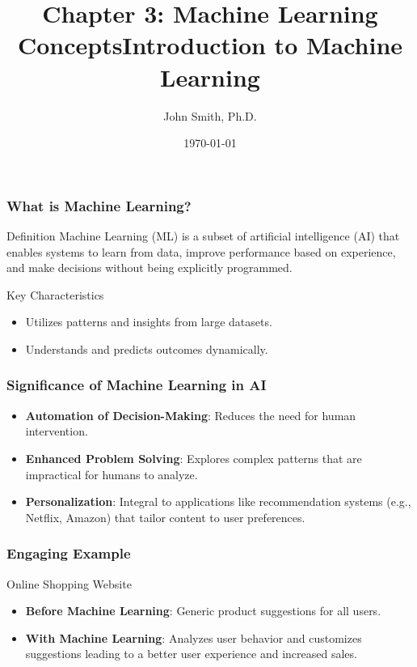 \documentclass[aspectratio=169]{beamer}
\title[Machine Learning Concepts]{Chapter 3: Machine Learning Concepts}
\author[J. Smith]{John Smith, Ph.D.}
\date{\today}
\begin{document}
\frame{\titlepage}

\begin{frame}[fragile]
    \title{Introduction to Machine Learning}
\end{frame}

\begin{frame}[fragile]
    \frametitle{What is Machine Learning?}
    \begin{block}{Definition}
        Machine Learning (ML) is a subset of artificial intelligence (AI) that enables systems to learn from data, improve performance based on experience, and make decisions without being explicitly programmed. 
    \end{block}
    \begin{block}{Key Characteristics}
        \begin{itemize}
            \item Utilizes patterns and insights from large datasets.
            \item Understands and predicts outcomes dynamically.
        \end{itemize}
    \end{block}
\end{frame}

\begin{frame}[fragile]
    \frametitle{Significance of Machine Learning in AI}
    \begin{itemize}
        \item \textbf{Automation of Decision-Making}: 
        Reduces the need for human intervention.
        
        \item \textbf{Enhanced Problem Solving}: 
        Explores complex patterns that are impractical for humans to analyze.
        
        \item \textbf{Personalization}: 
        Integral to applications like recommendation systems (e.g., Netflix, Amazon) that tailor content to user preferences.
    \end{itemize}
\end{frame}

\begin{frame}[fragile]
    \frametitle{Engaging Example}
    \begin{block}{Online Shopping Website}
        \begin{itemize}
            \item \textbf{Before Machine Learning}: 
            Generic product suggestions for all users.
            
            \item \textbf{With Machine Learning}: 
            Analyzes user behavior and customizes suggestions leading to a better user experience and increased sales.
        \end{itemize}
    \end{block}
\end{frame}
\end{document}
